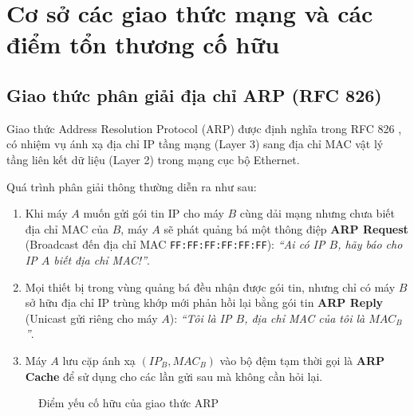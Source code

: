\section{Cơ sở các giao thức mạng và các điểm tổn thương cố hữu}

\subsection{Giao thức phân giải địa chỉ ARP (RFC 826)}

Giao thức Address Resolution Protocol (ARP) được định nghĩa trong RFC 826 \cite{rfc826_arp}, có nhiệm vụ ánh xạ địa chỉ IP tầng mạng (Layer 3) sang địa chỉ MAC vật lý tầng liên kết dữ liệu (Layer 2) trong mạng cục bộ Ethernet.

Quá trình phân giải thông thường diễn ra như sau:
\begin{enumerate}
  \item Khi máy $A$ muốn gửi gói tin IP cho máy $B$ cùng dải mạng nhưng chưa biết địa chỉ MAC của $B$, máy $A$ sẽ phát quảng bá một thông điệp \textbf{ARP Request} (Broadcast đến địa chỉ MAC \texttt{FF:FF:FF:FF:FF:FF}): \textit{``Ai có IP $B$, hãy báo cho IP $A$ biết địa chỉ MAC!''}.
  \item Mọi thiết bị trong vùng quảng bá đều nhận được gói tin, nhưng chỉ có máy $B$ sở hữu địa chỉ IP trùng khớp mới phản hồi lại bằng gói tin \textbf{ARP Reply} (Unicast gửi riêng cho máy $A$): \textit{``Tôi là IP $B$, địa chỉ MAC của tôi là $MAC_B$''}.
  \item Máy $A$ lưu cặp ánh xạ $(IP_B, MAC_B)$ vào bộ đệm tạm thời gọi là \textbf{ARP Cache} để sử dụng cho các lần gửi sau mà không cần hỏi lại.
\end{enumerate}

\begin{figure}[htbp]
  \centering
  \caption{Điểm yếu cố hữu của giao thức ARP}
  \label{fig:arp-weakness}
\end{figure}

